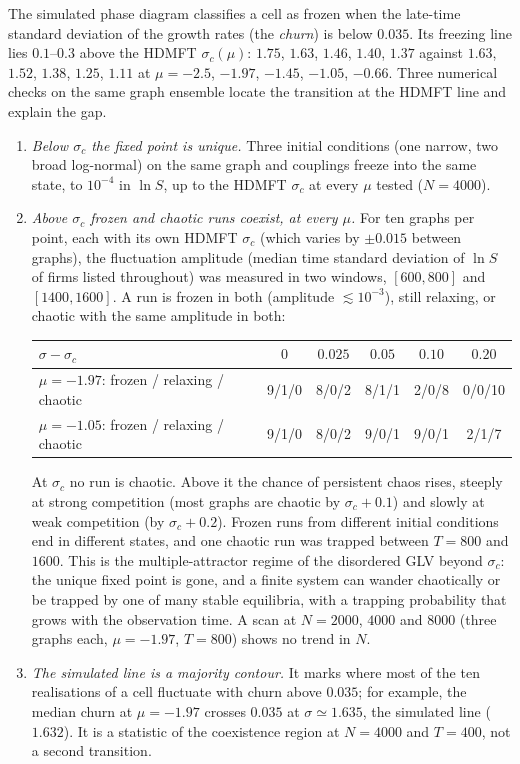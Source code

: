 \documentclass[11pt]{article}
\begin{document}
The simulated phase diagram classifies a cell as frozen when the late-time standard deviation of
the growth rates (the \emph{churn}) is below $0.035$.  Its freezing line lies $0.1$--$0.3$ above the
HDMFT $\sigma_c(\mu)$: $1.75$, $1.63$, $1.46$, $1.40$, $1.37$ against $1.63$, $1.52$, $1.38$, $1.25$,
$1.11$ at $\mu=-2.5$, $-1.97$, $-1.45$, $-1.05$, $-0.66$.  Three numerical checks on the same graph
ensemble locate the transition at the HDMFT line and explain the gap.
\begin{enumerate}
  \item \emph{Below $\sigma_c$ the fixed point is unique.}  Three initial conditions (one narrow,
        two broad log-normal) on the same graph and couplings freeze into the same state, to
        $10^{-4}$ in $\ln S$, up to the HDMFT $\sigma_c$ at every $\mu$ tested ($N=4000$).
  \item \emph{Above $\sigma_c$ frozen and chaotic runs coexist, at every $\mu$.}  For ten graphs
        per point, each with its own HDMFT $\sigma_c$ (which varies by $\pm0.015$ between graphs), the
        fluctuation amplitude (median time standard deviation of $\ln S$ of firms listed throughout)
        was measured in two windows, $[600,800]$ and $[1400,1600]$.  A run is frozen in both
        (amplitude $\lesssim10^{-3}$), still relaxing, or chaotic with the same amplitude in both:
        \begin{center}\small
        \begin{tabular}{l|ccccc}
        \toprule
        $\sigma-\sigma_c$ & $0$ & $0.025$ & $0.05$ & $0.10$ & $0.20$\\
        \midrule
        $\mu=-1.97$: frozen / relaxing / chaotic & 9/1/0 & 8/0/2 & 8/1/1 & 2/0/8 & 0/0/10\\
        $\mu=-1.05$: frozen / relaxing / chaotic & 9/1/0 & 8/0/2 & 9/0/1 & 9/0/1 & 2/1/7\\
        \bottomrule
        \end{tabular}
        \end{center}
        At $\sigma_c$ no run is chaotic.  Above it the chance of persistent chaos rises, steeply at
        strong competition (most graphs are chaotic by $\sigma_c+0.1$) and slowly at weak competition
        (by $\sigma_c+0.2$).  Frozen runs from different initial conditions end in different states,
        and one chaotic run was trapped between $T=800$ and $1600$.  This is the multiple-attractor
        regime of the disordered GLV beyond $\sigma_c$: the unique fixed point is gone, and a finite
        system can wander chaotically or be trapped by one of many stable equilibria, with a
        trapping probability that grows with the observation time.  A scan at $N=2000$, $4000$ and
        $8000$ (three graphs each, $\mu=-1.97$, $T=800$) shows no trend in $N$.
  \item \emph{The simulated line is a majority contour.}  It marks where most of the ten
        realisations of a cell fluctuate with churn above $0.035$; for example, the median churn at
        $\mu=-1.97$ crosses $0.035$ at $\sigma\simeq1.635$, the simulated line ($1.632$).  It is a
        statistic of the coexistence region at $N=4000$ and $T=400$, not a second transition.
\end{enumerate}
\end{document}
